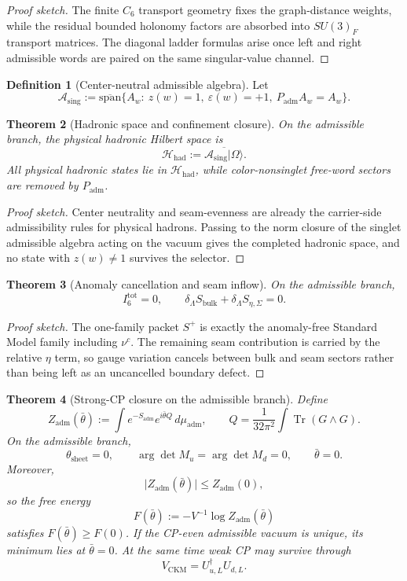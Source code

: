 \documentclass[11pt,a4paper]{article}
\newtheorem{theorem}{Theorem}[section]
\theoremstyle{definition}
\newtheorem{definition}[theorem]{Definition}
\theoremstyle{remark}
\DeclareMathOperator{\tr}{Tr}
\newcommand{\Seam}{\Sigma}
\newcommand{\Asing}{\mathcal A_{\mathrm{sing}}}
\newcommand{\Hhad}{\mathcal H_{\mathrm{had}}}
\newcommand{\Padm}{P_{\mathrm{adm}}}
\begin{document}
\begin{proof}[Proof sketch]
The finite $C_6$ transport geometry fixes the graph-distance weights, while the residual bounded holonomy factors are absorbed into $SU(3)_F$ transport matrices. The diagonal ladder formulas arise once left and right admissible words are paired on the same singular-value channel.
\end{proof}

\begin{definition}[Center-neutral admissible algebra]
Let
\[
\Asing
:=
\overline{\mathrm{span}}\{A_w:\ z(w)=1,\ \varepsilon(w)=+1,\ \Padm A_w=A_w\}.
\]
\end{definition}

\begin{theorem}[Hadronic space and confinement closure]
On the admissible branch, the physical hadronic Hilbert space is
\[
\Hhad:=\overline{\Asing|\Omega\rangle}.
\]
All physical hadronic states lie in $\Hhad$, while color-nonsinglet free-word sectors are removed by $\Padm$.
\end{theorem}

\begin{proof}[Proof sketch]
Center neutrality and seam-evenness are already the carrier-side admissibility rules for physical hadrons. Passing to the norm closure of the singlet admissible algebra acting on the vacuum gives the completed hadronic space, and no state with $z(w)\neq 1$ survives the selector.
\end{proof}

\begin{theorem}[Anomaly cancellation and seam inflow]
On the admissible branch,
\[
I_6^{\mathrm{tot}}=0,
\qquad
\delta_\Lambda S_{\mathrm{bulk}}+\delta_\Lambda S_{\eta,\Seam}=0.
\]
\end{theorem}

\begin{proof}[Proof sketch]
The one-family packet $S^+$ is exactly the anomaly-free Standard Model family including $\nu^c$. The remaining seam contribution is carried by the relative $\eta$ term, so gauge variation cancels between bulk and seam sectors rather than being left as an uncancelled boundary defect.
\end{proof}

\begin{theorem}[Strong-CP closure on the admissible branch]
\label{thm:strong-cp-closure}
Define
\[
Z_{\mathrm{adm}}(\bar\theta)
:=
\int e^{-S_{\mathrm{adm}}}e^{i\bar\theta Q}\,d\mu_{\mathrm{adm}},
\qquad
Q=\frac{1}{32\pi^2}\int \tr(G\wedge G).
\]
On the admissible branch,
\[
\theta_{\mathrm{sheet}}=0,
\qquad
\arg\det M_u=\arg\det M_d=0,
\qquad
\bar\theta=0.
\]
Moreover,
\[
\bigl|Z_{\mathrm{adm}}(\bar\theta)\bigr|\le Z_{\mathrm{adm}}(0),
\]
so the free energy
\[
F(\bar\theta):=-V^{-1}\log Z_{\mathrm{adm}}(\bar\theta)
\]
satisfies $F(\bar\theta)\ge F(0)$. If the CP-even admissible vacuum is unique, its minimum lies at $\bar\theta=0$. At the same time weak CP may survive through
\[
V_{\mathrm{CKM}}=U_{u,L}^\dagger U_{d,L}.
\]
\end{theorem}
\end{document}
